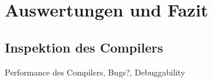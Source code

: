 \part{Auswertungen und Fazit}
\chapter{Inspektion des Compilers}
\label{chapter}

Performance des Compilers, Bugs?, Debuggability

